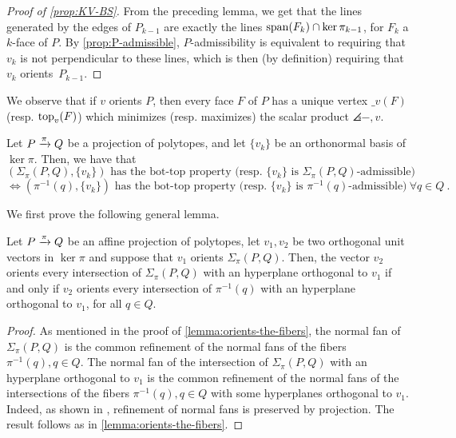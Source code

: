 \begin{proof}[Proof of \cref{prop:KV-BS}]
	From the preceding lemma, we get that the lines generated by the edges of $P_{k-1}$ are exactly the lines $\operatorname{\mathrm{span}}(F_k)\cap \ker \pi_{k-1}$, for $F_k$ a $k$-face of $P$.
	By \cref{prop:P-admissible}, $P$-admissibility is equivalent to requiring that $v_k$ is not perpendicular to these lines, which is then (by definition) requiring that $v_k$ orients~$P_{k-1}$.
\end{proof}

We observe that if $v$ orients $P$, then every face $F$ of $P$ has a unique vertex $\bm_v(F)$ (resp. $\operatorname{top}_v(F)$) which minimizes (resp. maximizes) the scalar product $\angles{-,v}$.

\begin{proposition}
	\label{prop:bot-top-for-fibers}
	Let $P \xrightarrow{\pi} Q$ be a projection of polytopes, and let $\{v_k\}$ be an orthonormal basis of $\ker \pi$. 
	Then, we have that
	\[
	(\Sigma_\pi(P,Q),\{v_k\}) \text{ has the bot-top property (resp. } \{v_k\} \text{ is }\Sigma_\pi(P,Q)\text{-admissible)}
	\]
	\[
	\iff (\pi^{-1}(q),\{v_k\}) \text{ has the bot-top property (resp. } \{v_k\} \text{ is }\pi^{-1}(q)\text{-admissible)} \ \forall q \in Q \ .
	\]
\end{proposition}

We first prove the following general lemma.

\begin{lemma} \label{lemma:iterated-orientation}
	Let $P\xrightarrow{\pi} Q$ be an affine projection of polytopes, let $v_1, v_2$ be two orthogonal unit vectors in $\ker \pi$ and suppose that $v_1$ orients $\Sigma_\pi (P,Q)$.
	Then, the vector $v_2$ orients every intersection of $\Sigma_\pi (P,Q)$ with an hyperplane orthogonal to $v_1$ if and only if $v_2$ orients every intersection of $\pi^{-1}(q)$ with an hyperplane orthogonal to $v_1$, for all $q \in Q$.
\end{lemma}

\begin{proof}
	As mentioned in the proof of \cref{lemma:orients-the-fibers}, the normal fan of $\Sigma_\pi(P,Q)$ is the common refinement of the normal fans of the fibers $\pi^{-1}(q), q \in Q$.
	The normal fan of the intersection of $\Sigma_\pi(P,Q)$ with an hyperplane orthogonal to $v_1$ is the common refinement of the normal fans of the intersections of the fibers $\pi^{-1}(q), q \in Q$ with some hyperplanes orthogonal to $v_1$.
	Indeed, as shown in \cite[Lemma 3.1]{BilleraSturmfels94}, refinement of normal fans is preserved by projection.
	The result follows as in \cref{lemma:orients-the-fibers}.
\end{proof}

